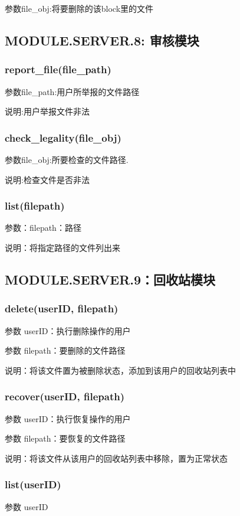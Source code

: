 参数file\_obj:将要删除的该block里的文件
\subsection{MODULE.SERVER.8: 审核模块}
\subsubsection{report\_file(file\_path)}
参数file\_path:用户所举报的文件路径

说明:用户举报文件非法

\subsubsection{check\_legality(file\_obj)}
参数file\_obj:所要检查的文件路径.

说明:检查文件是否非法


\subsubsection{list(filepath)}
参数：filepath：路径

说明：将指定路径的文件列出来


\subsection{MODULE.SERVER.9：回收站模块}

\subsubsection{delete(userID, filepath)}
参数 userID：执行删除操作的用户

参数 filepath：要删除的文件路径

说明：将该文件置为被删除状态，添加到该用户的回收站列表中

\subsubsection{recover(userID, filepath)}
参数 userID：执行恢复操作的用户

参数 filepath：要恢复的文件路径

说明：将该文件从该用户的回收站列表中移除，置为正常状态

\subsubsection{list(userID)}
参数 userID

